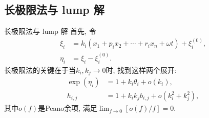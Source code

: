 \documentclass{beamer}
\newcommand{\sbrace}[1]{\left(#1\right)}
\begin{document}
\subsection{长极限法与 lump 解}
\begin{frame}{长极限法与 lump 解}
首先, 令
\begin{equation}
\begin{split}
    \xi_i&=k_i\sbrace{x_1+p_ix_2+\cdots+r_ix_n+\omega t}+\xi_i^{(0)},\\
    \eta_i&=\xi_i-\xi_i^{(0)}.
\end{split}
\end{equation}
长极限法的关键在于当$k_i,k_j\rightarrow 0$时, 找到这样两个展开:
\begin{equation}
\begin{split}
    \exp(\eta_i)&=1+k_i \theta_i+o(k_i), \\ 
    h_{i,j}&=1+k_ik_jb_{i,j}+o(k_i^2+k_j^2),
\end{split} \label{lump-expansion}
\end{equation}
其中$o(f)$是Peano余项, 满足$\lim_{f\rightarrow 0}[o(f)/f]=0$.
\end{frame}
\end{document}
